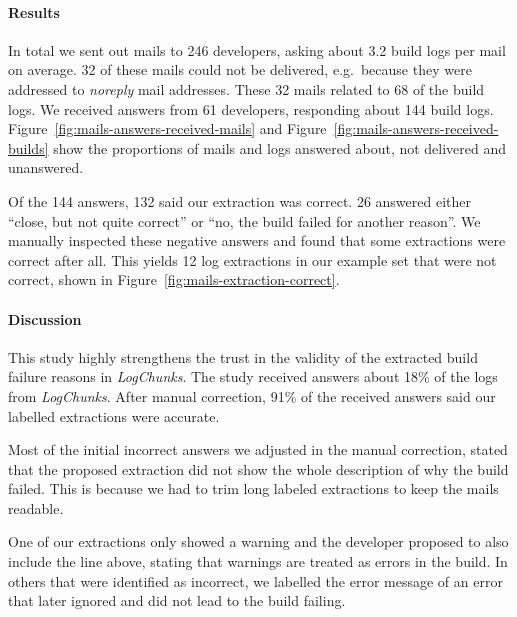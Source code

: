 \documentclass[\myrootdir/main.tex]{subfiles}
\begin{document}
\paragraph{Results}
In total we sent out mails to 246 developers, asking about 3.2 build logs per mail on average.
32 of these mails could not be delivered, e.g.\ because they were addressed to \emph{noreply} mail addresses.
These 32 mails related to 68 of the build logs.
We received answers from 61 developers, responding about 144 build logs.
Figure~\ref{fig:mails-answers-received-mails} and Figure~\ref{fig:mails-answers-received-builds} show the proportions of mails and logs answered about, not delivered and unanswered.

Of the 144 answers, 132 said our extraction was correct.
26 answered either ``close, but not quite correct'' or ``no, the build failed for another reason''.
We manually inspected these negative answers and found that some extractions were correct after all.
This yields 12 log extractions in our example set that were not correct, shown in Figure~\ref{fig:mails-extraction-correct}.

\paragraph{Discussion}
This study highly strengthens the trust in the validity of the extracted build failure reasons in \emph{LogChunks}.
The study received answers about 18\% of the logs from \emph{LogChunks}.
After manual correction, 91\% of the received answers said our labelled extractions were accurate.

Most of the initial incorrect answers we adjusted in the manual correction, stated that the proposed extraction did not show the whole description of why the build failed.
This is because we had to trim long labeled extractions to keep the mails readable.

One of our extractions only showed a warning and the developer proposed to also include the line above, stating that warnings are treated as errors in the build.
In others that were identified as incorrect, we labelled the error message of an error that later ignored and did not lead to the build failing.
\end{document}
